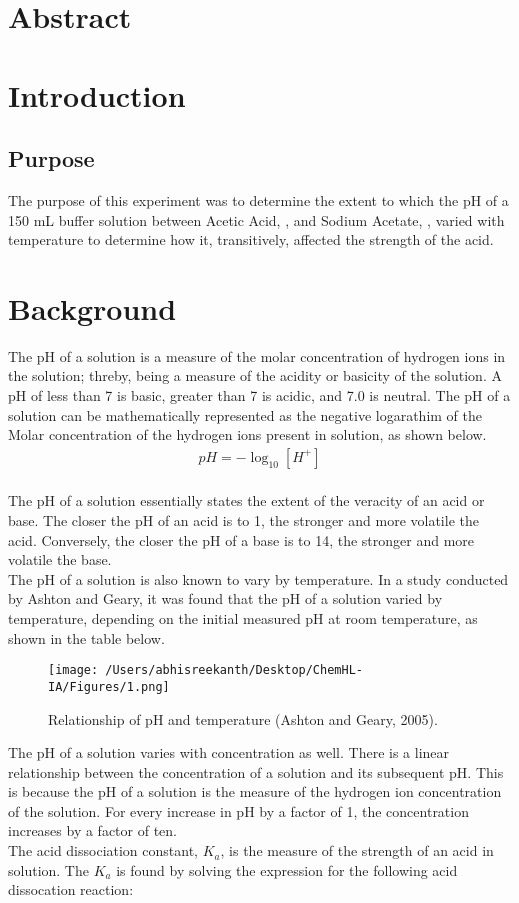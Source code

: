 \documentclass{article}
\begin{document}

\section*{Abstract}

\section*{Introduction} %
\subsection*{Purpose}
The purpose of this experiment was to determine the extent to which the pH of a 150 mL buffer solution between Acetic Acid, , and Sodium Acetate, , varied with temperature to determine how it, transitively, affected the strength of the acid. 

\section*{Background}%
The pH of a solution is a measure of the molar concentration of hydrogen ions in the solution; threby, being a measure of the acidity or basicity of the solution. A pH of less than 7 is basic, greater than 7 is acidic, and 7.0 is neutral. The pH of a solution can be mathematically represented as the negative logarathim of the Molar concentration of the hydrogen ions present in solution, as shown below. 
\begin{eqnarray*}
pH = -\log_{10}[H^+]
\end{eqnarray*} \\
\noindent
The pH of a solution essentially states the extent of the veracity of an acid or base. The closer the pH of an acid is to 1, the stronger and more volatile the acid. Conversely, the closer the pH of a base is to 14, the stronger and more volatile the base. \\
\noindent
The pH of a solution is also known to vary by temperature. In a study conducted by Ashton and Geary, it was found that the pH of a solution varied by temperature, depending on the initial measured pH at room temperature, as shown in the table below. 
\begin{figure}[H]
	\centering
	\texttt{[image: /Users/abhisreekanth/Desktop/ChemHL-IA/Figures/1.png]}
	\caption{Relationship of pH and temperature (Ashton and Geary, 2005).}
\end{figure} 
\noindent
The pH of a solution varies with concentration as well. There is a linear relationship between the concentration of a solution and its subsequent pH. This is because the pH of a solution is the measure of the hydrogen ion concentration of the solution. For every increase in pH by a factor of 1, the concentration increases by a factor of ten. \\
\noindent
The acid dissociation constant, $K_a$, is the measure of the strength of an acid in solution. The $K_a$ is found by solving the expression for the following acid dissocation reaction: \\
\end{document}
